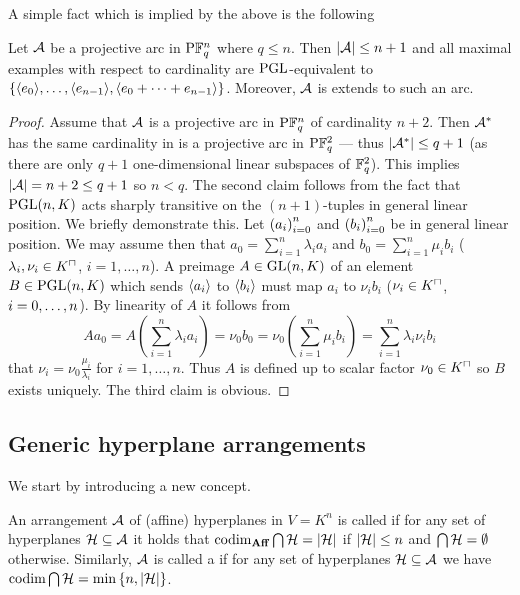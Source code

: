 A simple fact which is implied by the above is the following
%
\begin{corollary}\label{mds-ngeqq}
    Let $\mathcal{A}$ be a projective arc in $\P \field{q}^n$ where $q\leq n$. Then $\left\vert{\mathcal{A}}\right\vert\leq n+1$ and all maximal examples with respect to cardinality are $\mathrm{PGL}$-equivalent to $\set{\gen{e_0},\ldots,\gen{e_{n-1}},\gen{e_0+\cdots+e_{n-1}}}$. Moreover, $\mathcal{A}$ is extends to such an arc.
\end{corollary}

\begin{proof}
    Assume that $\mathcal{A}$ is a projective arc in $\P \field{q}^n$ of cardinality $n+2$. Then ${\mathcal{A}}^{\ast}$ has the same cardinality in is a projective arc in $\P \field{q}^2$ --- thus $\left\vert{{\mathcal{A}}^{\ast}}\right\vert\leq q+1$ (as there are only $q+1$ one-dimensional linear subspaces of $\mathbb{F}_{q}^2$). This implies $\left\vert{\mathcal{A}}\right\vert=n+2\leq q+1$ so $n<q$.
    The second claim follows from the fact that $\mathrm{PGL}(n,K)$ acts sharply transitive on the $(n+1)$-tuples in general linear position.
    We briefly demonstrate this. Let $\seq{a_i}_{i=0}^n$ and $\seq{b_i}_{i=0}^n$ be in general linear position. We may assume then that $a_0=\sum_{i=1}^n{\lambda_i a_i}$ and $b_0=\sum_{i=1}^n{\mu_i b_i}$ ($\lambda_i,\nu_i\in \units K$, $i=1,\ldots,n$).
    A preimage $A\in\mathrm{GL}(n,K)$ of an element $B\in\mathrm{PGL}(n,K)$ which sends $\gen{a_i}$ to $\gen{b_i}$ must map $a_i$ to $\nu_i b_i$ ($\nu_i\in \units K$, $i=\range 0 n$). By linearity of $A$ it follows from
    $$
    Aa_0=A\left(\sum_{i=1}^n{\lambda_i a_i}\right)=\nu_0 b_0=\nu_0\left(\sum_{i=1}^n{\mu_i b_i}\right)=\sum_{i=1}^n{\lambda_i\nu_i b_i}
    $$
    that $\nu_i=\nu_0\frac{\mu_i}{\lambda_i}$ for $i=1,\ldots,n$. Thus $A$ is defined up to scalar factor $\nu_0\in \units K$ so $B$ exists uniquely.
    The third claim is obvious.
\end{proof}
\subsection{Generic hyperplane arrangements}

We start by introducing a new concept.

\begin{definition}
    An arrangement $\mathcal{A}$ of (affine) hyperplanes in $V=K^n$ is called  if for any set of hyperplanes $\mathcal{H}\subseteq\mathcal{A}$ it holds that $\mathop\mathrm{codim}_{\mathbf{Aff}}{\bigcap\mathcal{H}}=\left\vert{\mathcal{H}}\right\vert$ if $\left\vert{\mathcal{H}}\right\vert\leq n$ and $\bigcap\mathcal{H}=\emptyset$ otherwise.
    Similarly, $\mathcal{A}$ is called a  if for any set of hyperplanes $\mathcal{H}\subseteq\mathcal{A}$ we have $\codim{\Setmeet\cH}=\min\set{n,\card{\cH}}$.
\end{definition}

